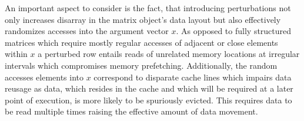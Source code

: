     An important aspect to consider is the fact, that introducing perturbations not only increases disarray in the matrix object's
    data layout but also effectively randomizes accesses into the argument vector $x$. As opposed to fully structured
    matrices which require mostly regular accesses of adjacent or close elements within $x$ a perturbed row entails
    reads of unrelated memory locations at irregular intervals which compromises memory prefetching. Additionally, the
    random accesses elements into $x$ correspond to disparate cache lines which impairs data reusage as
    data, which resides in the cache and which will be required at a later point of execution, is more likely to be
    spuriously evicted. This requires data to be read multiple times raising the effective amount of data movement.

